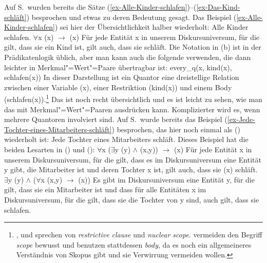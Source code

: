 Auf S.\,\pageref{ex-Alle-Kinder-schlafen} wurden bereits die Sätze
(\ref{ex-Alle-Kinder-schlafen})--(\ref{ex-Das-Kind-schläft}) besprochen und etwas zu deren Bedeutung
gesagt. Das Beispiel (\ref{ex-Alle-Kinder-schlafen}) sei hier der Übersichtlichkeit halber
wiederholt:
\eal
\label{ex-Alle-Kinder-schlafen-zwei}
\ex Alle Kinder schlafen.
\ex $\forall$x (x) $\to$ (x)
\ex Für jede Entität x in unserem Diskursuniversum, für die gilt, dass sie ein Kind ist, gilt auch,
dass sie schläft.
\zl
Die Notation in (b) ist in der Prädikatenlogik üblich, aber man kann auch die folgende verwenden, die
dann leichter in Merkmal"=Wert"=Paare übertragbar ist:
\ea
\label{ex-every-kind-schlafen}
every\_q(x, kind(x), schlafen(x))
\z
In dieser Darstellung ist ein Quantor eine dreistellige Relation zwischen einer Variable (x),
einer Restriktion (kind(x)) und einem Body (schlafen(x)).\footnote{%
  \citet[89--90]{Heim2011a-u}, \citet[7]{Diesing92a} und \citet[130]{Kratzer95a} sprechen von
  \emph{restrictive clause} und \emph{nuclear scope}. \citet*[287]{mrs} vermeiden den Begriff \emph{scope}
  bewusst und benutzen stattdessen \emph{body}, da es noch ein allgemeineres Verständnis von Skopus
  gibt und sie Verwirrung vermeiden wollen.%
} Das ist noch recht übersichtlich und es
ist leicht zu sehen, wie man das mit Merkmal"=Wert"=Paaren ausdrücken kann. Komplizierter wird es,
wenn mehrere Quantoren involviert sind. Auf S.\,\pageref{ex-Jede-Tochter-eines-Mitarbeiters-schläft} wurde bereits das Beispiel
(\ref{ex-Jede-Tochter-eines-Mitarbeiters-schläft}) besprochen, das hier noch einmal als ()
wiederholt ist:
\ea
\label{ex-Jede-Tochter-eines-Mitarbeiters-schläft-zwei}
Jede Tochter eines Mitarbeiters schläft.
\z
{}
\noindent
Dieses Beispiel hat die beiden Lesarten in () und ():
\eal
\label{ex-Jede Tochter eines Mitarbeiters schläft. weiter Skopus Allquantor}
\ex $\forall$x ($\exists$y (y) $\wedge$ (x,y)) $\to$
(x)
\ex Für jede Entität x in unserem Diskursuniversum, für die gilt, dass es im Diskursuniversum eine Entität y gibt, die
Mitarbeiter ist und deren Tochter x ist, gilt auch, dass sie (x) schläft.
\zl
\eal
\label{ex-Jede Tochter eines Mitarbeiters schläft. weiter Skopus Existenzquantor}
\ex $\exists$y (y) $\wedge$ ($\forall$x (x,y) $\to$
(x))
\ex Es gibt im Diskursuniversum eine Entität y, für die gilt, dass sie ein Mitarbeiter ist und dass für alle Entitäten
x im Diskursuniversum, für die gilt, dass sie die Tochter von y sind, auch gilt, dass sie schlafen.
\zl

